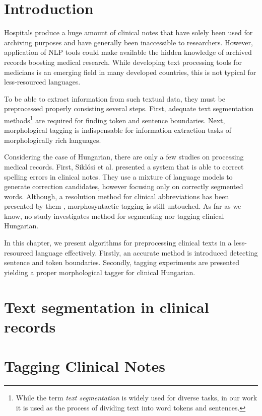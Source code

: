 
\section{Introduction}

Hospitals produce a huge amount of clinical notes that have solely been used for archiving purposes and have generally been inaccessible to researchers. However, application of NLP tools could make available the hidden knowledge of archived records boosting medical research. 
While developing text processing tools for medicians is an emerging field in many developed countries, this is not typical for less-resourced languages.

To be able to extract information from such textual data, they must be preprocessed properly consisting several steps.
First, adequate text segmentation methods\footnote{While the term \emph{text segmentation} is widely used for diverse tasks, in our work it is used as the process of dividing text into word tokens and sentences.} 
are required for finding token and sentence boundaries. Next, morphological tagging is indispensable for information extraction tasks of morphologically rich languages. 

Considering the case of Hungarian, there are only a few studies on processing medical records. First, Siklósi et al. \cite{Siklosi2012,Siklosi2013} presented a system that is able to correct spelling errors in clinical notes. They use a mixture of language models to generate correction candidates, however focusing only on correctly segmented words. 
Although, a resolution method for clinical abbreviations has been presented by them \cite{Siklosi2013b}, morphosyntactic tagging is still untouched. 
As far as we know, no study investigates method for segmenting nor tagging clinical Hungarian. 

In this chapter, we present algorithms for preprocessing clinical texts in a less-resourced language effectively. Firstly, an accurate method is introduced detecting sentence and token boundaries. Secondly, tagging experiments are presented yielding a proper morphological tagger for clinical Hungarian. 


\section{Text segmentation in clinical records}


\pagebreak

\section{Tagging Clinical Notes}


